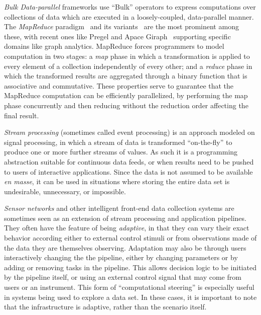 {\em Bulk Data-parallel} frameworks use ``Bulk'' operators to express computations over 
collections of data which are executed in a loosely-coupled, data-parallel manner.
The {\em MapReduce} paradigm~\cite{MapReduce} and its variants~\cite{twister,hmr} are the most
prominent among these, with recent ones like Pregel and Apace Giraph~\cite{pregel} supporting specific domains like
graph analytics. MapReduce forces programmers to model computation in two stages: 
a \emph{map} phase in which a transformation is applied to every element of a collection independently of every other;  and a \emph{reduce} phase in which the transformed results 
are aggregated through a binary function that is associative and commutative. 
These properties serve to guarantee that the MapReduce computation can be efficiently 
parallelized, by performing the map phase concurrently and
then reducing without the reduction order affecting the final result. 

{\em Stream processing} (sometimes called event processing) is an approach modeled 
on signal processing, in which a stream of data is transformed ``on-the-fly'' to produce one or
more further streams of values. As such it is a programming
abstraction suitable for continuous data feeds, or when results need
to be pushed to users of interactive applications. Since the data is
not assumed to be available \textit{en masse}, it can be used in
situations where storing the entire data set is undesirable,
unnecessary, or impossible. 

{\em Sensor networks} and other intelligent front-end data collection systems are sometimes seen as an extension of stream processing and application pipelines.
They often have the feature of being \emph{adaptive}, in that they can vary their exact behavior according either to external control stimuli or from observations made of the data they are 
themselves observing. Adaptation may also be through users interactively changing the
the pipeline, either by changing parameters or by adding or removing
tasks in the pipeline. This allows decision logic to be initiated by
the pipeline itself, or using an external control signal that may come
from users or an instrument. This form of ``computational steering''
is especially useful in systems being used to explore a data set. In these cases, it is important to 
note that the infrastructure is adaptive, rather than the scenario itself.


